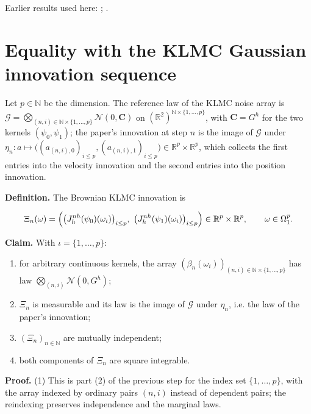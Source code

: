 \documentclass[11pt,a4paper]{article}
\begin{document}
Earlier results used here: \cite[Section~3.8.16]{LangevinLean2026ULASC}; \cite[Section~3.8.17]{LangevinLean2026ULASC}.

\section{\texorpdfstring{Equality with the KLMC Gaussian innovation sequence}{Equality with the KLMC Gaussian innovation sequence}}


Let \(p\in\mathbb N\) be the dimension. The reference law of the KLMC noise array is \(\mathcal G=\bigotimes_{(n,i)\in\mathbb N\times\{1,\dots,p\}}\mathcal N(0,\mathbf C)\) on \((\mathbb R^2)^{\mathbb N\times\{1,\dots,p\}}\), with \(\mathbf C=G^h\) for the two kernels \((\psi_0,\psi_1)\); the paper's innovation at step \(n\) is the image of \(\mathcal G\) under \(\eta_n:a\mapsto\bigl((a_{(n,i),0})_{i\le p},(a_{(n,i),1})_{i\le p}\bigr)\in\mathbb R^p\times\mathbb R^p\), which collects the first entries into the velocity innovation and the second entries into the position innovation.




\textbf{Definition.} The Brownian KLMC innovation is


\[\Xi_n(\omega)=\Bigl(\bigl(J^{nh}_h(\psi_0)(\omega_i)\bigr)_{i\le p},\ \bigl(J^{nh}_h(\psi_1)(\omega_i)\bigr)_{i\le p}\Bigr)\in\mathbb R^p\times\mathbb R^p,\qquad\omega\in\Omega_1^{p}.\]


\textbf{Claim.} With \(\iota=\{1,\dots,p\}\):



\begin{enumerate}


\item for arbitrary continuous kernels, the array \((\beta_n(\omega_i))_{(n,i)\in\mathbb N\times\{1,\dots,p\}}\) has law \(\bigotimes_{(n,i)}\mathcal N(0,G^h)\);

\item \(\Xi_n\) is measurable and its law is the image of \(\mathcal G\) under \(\eta_n\), i.e. the law of the paper's innovation;

\item \((\Xi_n)_{n\in\mathbb N}\) are mutually independent;

\item both components of \(\Xi_n\) are square integrable.

\end{enumerate}



\textbf{Proof.} (1) This is part (2) of the previous step for the index set \(\{1,\dots,p\}\), with the array indexed by ordinary pairs \((n,i)\) instead of dependent pairs; the reindexing preserves independence and the marginal laws.
\end{document}
